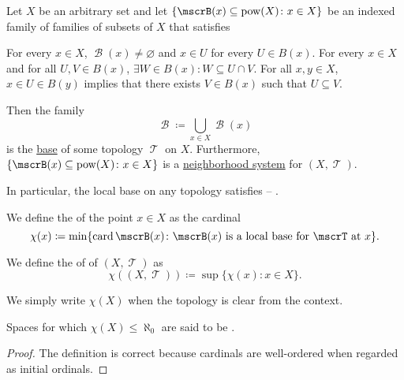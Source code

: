 \begin{proposition}\label{thm:topological_local_base_axioms}
  Let \( X \) be an arbitrary set and let \( \{ \mscrB(x) \subseteq \pow(X) \colon x \in X \} \) be an indexed family of families of subsets of \( X \) that satisfies
  \begin{thmenum}
     For every \( x \in X \), \( \mscrB(x) \neq \varnothing \) and \( x \in U \) for every \( U \in B(x) \).
     For every \( x \in X \) and for all \( U, V \in B(x) \), \( \exists W \in B(x): W \subseteq U \cap V \).
     For all \( x, y \in X \), \( x \in U \in B(y) \) implies that there exists \( V \in B(x) \) such that \( U \subseteq V \).
  \end{thmenum}

  Then the family
  \begin{equation*}
    \mscrB \coloneqq \bigcup_{x \in X} \mscrB(x)
  \end{equation*}
  is the \hyperref[thm:topological_base_axioms]{base} of some topology \( \mscrT \) on \( X \). Furthermore, \( \{ \mscrB(x) \subseteq \pow(X) \colon x \in X \} \) is a \hyperref[def:topological_local_base]{neighborhood system} for \( (X, \mscrT) \).

  In particular, the local base on any topology satisfies  -- .
\end{proposition}

\begin{definition}\label{def:topological_space_character}
  We define the  of the point \( x \in X \) as the cardinal
  \begin{equation*}
    \chi(x) \coloneqq \min \{ \card \mscrB(x) \colon \mscrB(x) \text{ is a local base for } \mscrT \text{ at } x \}.
  \end{equation*}

  We define the  of of \( (X, \mscrT) \) as
  \begin{equation*}
    \chi((X, \mscrT)) \coloneqq \sup \{ \chi(x) \colon x \in X \}.
  \end{equation*}

  We simply write \( \chi(X) \) when the topology is clear from the context.

  Spaces for which \( \chi(X) \leq \aleph_0 \) are said to be .
\end{definition}
\begin{proof}
  The definition is correct because cardinals are well-ordered when regarded as initial ordinals.
\end{proof}

